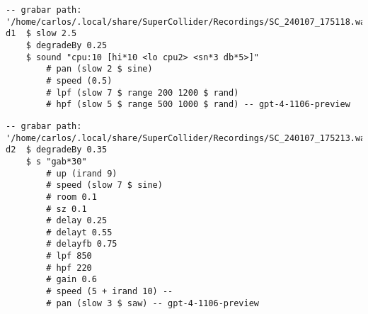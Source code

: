 \begin{minipage}[t]{1\textwidth}
    \centering
    \begin{lstlisting}[style=SuperCollider-IDE, language=ExtendedHaskell, basicstyle=\footnotesize\ttfamily, numbers=none]
-- grabar path: '/home/carlos/.local/share/SuperCollider/Recordings/SC_240107_175118.wav'
d1  $ slow 2.5 
    $ degradeBy 0.25 
    $ sound "cpu:10 [hi*10 <lo cpu2> <sn*3 db*5>]" 
        # pan (slow 2 $ sine) 
        # speed (0.5) 
        # lpf (slow 7 $ range 200 1200 $ rand) 
        # hpf (slow 5 $ range 500 1000 $ rand) -- gpt-4-1106-preview                              
    \end{lstlisting}
    \vspace{1cm}
\end{minipage}






\begin{minipage}[t]{1\textwidth}
    \centering
    \begin{lstlisting}[style=SuperCollider-IDE, language=ExtendedHaskell, basicstyle=\footnotesize\ttfamily, numbers=none]
-- grabar path: '/home/carlos/.local/share/SuperCollider/Recordings/SC_240107_175213.wav'
d2  $ degradeBy 0.35 
    $ s "gab*30" 
        # up (irand 9) 
        # speed (slow 7 $ sine) 
        # room 0.1 
        # sz 0.1 
        # delay 0.25 
        # delayt 0.55 
        # delayfb 0.75 
        # lpf 850 
        # hpf 220 
        # gain 0.6 
        # speed (5 + irand 10) -- 
        # pan (slow 3 $ saw) -- gpt-4-1106-preview                  
    \end{lstlisting}
    \vspace{1cm}
\end{minipage}











